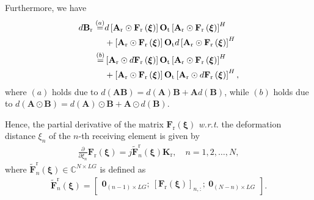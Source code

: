 \documentclass[lettersize,journal]{IEEEtran}
\begin{document}
Furthermore, we have
\begin{align}\label{eq53}
 d\mathbf{B}_{\textrm{r}}\overset{\left (a\right )}{=}&d\left [ \mathbf{A}_{\textrm{r}}\odot \mathbf{F}_{\textrm{r}}\left ( \boldsymbol{\xi} \right ) \right ]\mathbf{O}_{\textrm{t}}\left [ \mathbf{A}_{\textrm{r}}\odot \mathbf{F}_{\textrm{r}}\left ( \boldsymbol{\xi} \right ) \right ]^{H}\notag\\
&+\left [ \mathbf{A}_{\textrm{r}}\odot \mathbf{F}_{\textrm{r}}\left ( \boldsymbol{\xi} \right ) \right ]\mathbf{O}_{\textrm{t}}d\left [ \mathbf{A}_{\textrm{r}}\odot \mathbf{F}_{\textrm{r}}\left ( \boldsymbol{\xi} \right ) \right ]^{H}\notag\\
\overset{\left (b\right )}{=}&\left [ \mathbf{A}_{\textrm{r}}\odot d\mathbf{F}_{\textrm{r}}\left ( \boldsymbol{\xi} \right ) \right ]\mathbf{O}_{\textrm{t}}\left [ \mathbf{A}_{\textrm{r}}\odot \mathbf{F}_{\textrm{r}}\left ( \boldsymbol{\xi} \right ) \right ]^{H}\notag\\
&+\left [ \mathbf{A}_{\textrm{r}}\odot \mathbf{F}_{\textrm{r}}\left ( \boldsymbol{\xi} \right ) \right ]\mathbf{O}_{\textrm{t}}\left [ \mathbf{A}_{\textrm{r}}\odot d\mathbf{F}_{\textrm{r}}\left ( \boldsymbol{\xi} \right ) \right ]^{H},
\end{align}
where $\left (a\right )$ holds due to $d\left ( \mathbf{A}\mathbf{B} \right )=d\left ( \mathbf{A} \right )\mathbf{B}+\mathbf{A}d\left ( \mathbf{B} \right )$, while $\left ( b \right )$ holds due to $d\left ( \mathbf{A}\odot \mathbf{B} \right )=d\left ( \mathbf{A} \right )\odot \mathbf{B}+\mathbf{A}\odot d\left ( \mathbf{B} \right )$.

Hence, the partial derivative of the matrix $\mathbf{F}_{\textrm{r}}\left ( \boldsymbol{\xi} \right )$ \emph{w.r.t.} the deformation distance $\xi_{n} $ of the $n$-th receiving element is given by
\begin{align}\label{eq57}
 \frac{\partial }{\partial \xi_{n}}\mathbf{F}_{\textrm{r}}\left ( \boldsymbol{\xi}\right ) = j\tilde{\mathbf{F}}_{n}^{\textrm{r}}\left ( \boldsymbol{\xi} \right )\mathbf{K}_{\textrm{r}},\quad n=1,2,\ldots,N,
\end{align}
where $\tilde{\mathbf{F}}_{n}^{\textrm{r}}\left ( \boldsymbol{\xi} \right )\in \mathbb{C}^{N\times LG}$ is defined as
\begin{align}
 \tilde{\mathbf{F}}_{n}^{\textrm{r}}\left ( \boldsymbol{\xi} \right )= 
\begin{bmatrix}
\mathbf{0}_{\left ( n-1 \right )\times LG};\
\left [ \mathbf{F}_{\textrm{r}}\left ( \boldsymbol{\xi} \right ) \right ]_{n,:};\
\mathbf{0}_{\left ( N-n \right )\times LG}
\end{bmatrix}.
\end{align}
\end{document}
